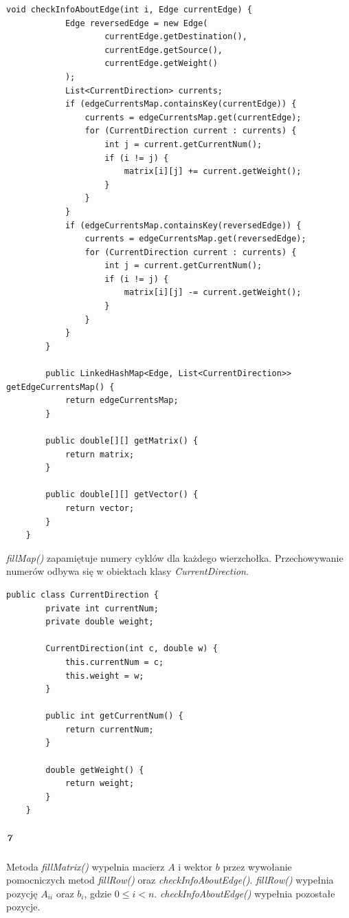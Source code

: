 \documentclass[12pt,a4paper]{article}
\begin{document}
\begin{Verbatim}[fontsize=\small]
        void checkInfoAboutEdge(int i, Edge currentEdge) {
            Edge reversedEdge = new Edge(
                    currentEdge.getDestination(),
                    currentEdge.getSource(),
                    currentEdge.getWeight()
            );
            List<CurrentDirection> currents;
            if (edgeCurrentsMap.containsKey(currentEdge)) {
                currents = edgeCurrentsMap.get(currentEdge);
                for (CurrentDirection current : currents) {
                    int j = current.getCurrentNum();
                    if (i != j) {
                        matrix[i][j] += current.getWeight();
                    }
                }
            }
            if (edgeCurrentsMap.containsKey(reversedEdge)) {
                currents = edgeCurrentsMap.get(reversedEdge);
                for (CurrentDirection current : currents) {
                    int j = current.getCurrentNum();
                    if (i != j) {
                        matrix[i][j] -= current.getWeight();
                    }
                }
            }
        }

        public LinkedHashMap<Edge, List<CurrentDirection>> getEdgeCurrentsMap() {
            return edgeCurrentsMap;
        }

        public double[][] getMatrix() {
            return matrix;
        }

        public double[][] getVector() {
            return vector;
        }
    }
\end{Verbatim}
\emph{fillMap()} zapamiętuje numery cyklów dla każdego wierzchołka. Przechowywanie
numerów odbywa się w obiektach klasy \emph{CurrentDirection}.
\begin{Verbatim}[fontsize=\small]
    public class CurrentDirection {
        private int currentNum;
        private double weight;

        CurrentDirection(int c, double w) {
            this.currentNum = c;
            this.weight = w;
        }

        public int getCurrentNum() {
            return currentNum;
        }

        double getWeight() {
            return weight;
        }
    }
\end{Verbatim}
\subparagraph{7} Metoda \emph{fillMatrix()} wypelnia macierz $A$ i wektor $b$
przez wywołanie pomocniczych metod \emph{fillRow()} oraz \emph{checkInfoAboutEdge()}.
\emph{fillRow()} wypełnia pozycję $A_{ii}$ oraz $b_i$, gdzie $0 \leq i < n$.
\emph{checkInfoAboutEdge()} wypełnia pozostałe pozycje.
\end{document}
